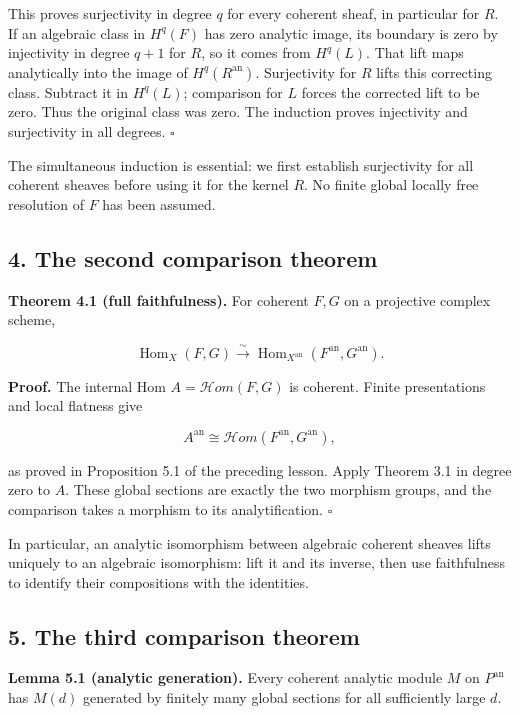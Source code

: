 \documentclass[11pt]{article}
\begin{document}
This proves surjectivity in degree \(q\) for every coherent sheaf, in
particular for \(R\). If an algebraic class in \(H^q(F)\) has zero
analytic image, its boundary is zero by injectivity in degree \(q+1\)
for \(R\), so it comes from \(H^q(L)\). That lift maps analytically into
the image of \(H^q(R^{\mathrm{an}})\). Surjectivity for \(R\) lifts this
correcting class. Subtract it in \(H^q(L)\); comparison for \(L\) forces
the corrected lift to be zero. Thus the original class was zero. The
induction proves injectivity and surjectivity in all degrees.
\(\square\)

The simultaneous induction is essential: we first establish surjectivity
for all coherent sheaves before using it for the kernel \(R\). No finite
global locally free resolution of \(F\) has been assumed.

\subsection{4. The second comparison
theorem}\label{the-second-comparison-theorem}

\textbf{Theorem 4.1 (full faithfulness).} For coherent \(F,G\) on a
projective complex scheme,

\[
\operatorname{Hom}_X(F,G)
\xrightarrow{\sim}
\operatorname{Hom}_{X^{\mathrm{an}}}(F^{\mathrm{an}},G^{\mathrm{an}}).
\]

\textbf{Proof.} The internal Hom \(A=\mathcal Hom(F,G)\) is coherent.
Finite presentations and local flatness give

\[
A^{\mathrm{an}}\cong\mathcal Hom(F^{\mathrm{an}},G^{\mathrm{an}}),
\]

as proved in Proposition 5.1 of the preceding lesson. Apply Theorem 3.1
in degree zero to \(A\). These global sections are exactly the two
morphism groups, and the comparison takes a morphism to its
analytification. \(\square\)

In particular, an analytic isomorphism between algebraic coherent
sheaves lifts uniquely to an algebraic isomorphism: lift it and its
inverse, then use faithfulness to identify their compositions with the
identities.

\subsection{5. The third comparison
theorem}\label{the-third-comparison-theorem}

\textbf{Lemma 5.1 (analytic generation).} Every coherent analytic module
\(M\) on \(P^{\mathrm{an}}\) has \(M(d)\) generated by finitely many
global sections for all sufficiently large \(d\).
\end{document}

